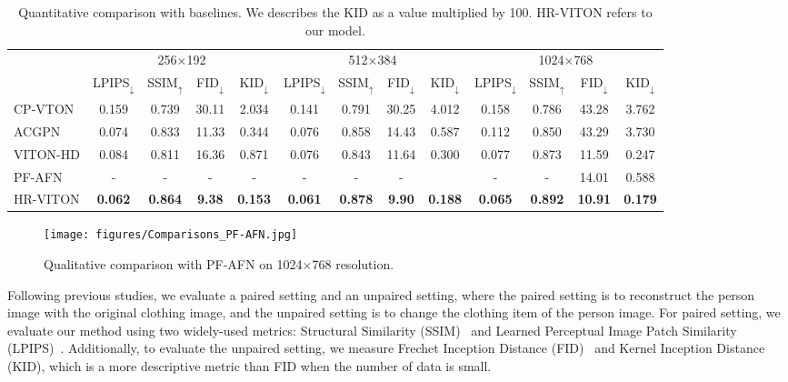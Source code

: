 \begin{table}[]
\centering
\scriptsize
\begin{tabular}{l|cccc|cccc|cccc}
    \toprule
     & \multicolumn{4}{c}{256$\times$192} & \multicolumn{4}{c}{512$\times$384} & \multicolumn{4}{c}{1024$\times$768}\\ 
& LPIPS$_{\downarrow}$ & SSIM$_{\uparrow}$ & FID$_{\downarrow}$ & KID$_{\downarrow}$ & LPIPS$_{\downarrow}$ & SSIM$_{\uparrow}$ & FID$_{\downarrow}$ & KID$_{\downarrow}$ & LPIPS$_{\downarrow}$ & SSIM$_{\uparrow}$ & FID$_{\downarrow}$ & KID$_{\downarrow}$ \\ 
    \midrule
    CP-VTON  & 0.159 & 0.739 & 30.11 & 2.034 
             & 0.141 & 0.791 & 30.25 & 4.012
             & 0.158 & 0.786 & 43.28 & 3.762
             \\
    ACGPN    & 0.074 & 0.833 & 11.33 & 0.344
             & 0.076 & 0.858 & 14.43 & 0.587
             & 0.112 & 0.850 & 43.29 & 3.730
             \\
    VITON-HD & 0.084 & 0.811 & 16.36 & 0.871
             & 0.076 & 0.843 & 11.64 & 0.300
             & 0.077 & 0.873 & 11.59 & 0.247
             \\
    PF-AFN & - & - & - & -
             & - & - & - &
             & - & - & 14.01 & 0.588
             \\
    \midrule
    HR-VITON    & \textbf{0.062} & \textbf{0.864} & \textbf{9.38} & \textbf{0.153}   
             & \textbf{0.061} & \textbf{0.878} & \textbf{9.90} & \textbf{0.188}
             & \textbf{0.065} & \textbf{0.892} & \textbf{10.91} & \textbf{0.179}
             \\ 
    \bottomrule
\end{tabular}
\caption{Quantitative comparison with baselines. 
         We describes the KID as a value multiplied by 100. HR-VITON refers to our model.}
\label{table:main}
\end{table}

\begin{figure}[b!]
    \texttt{[image: figures/Comparisons\_PF-AFN.jpg]}
    \caption{Qualitative comparison with PF-AFN on 1024×768 resolution.}
    \label{fig:PF}
\end{figure}
Following previous studies, we evaluate a paired setting and an unpaired setting, where the paired setting is to reconstruct the person image with the original clothing image, and the unpaired setting is to change the clothing item of the person image.
For paired setting, we evaluate our method using two widely-used metrics: Structural Similarity (SSIM)~\cite{wang2004image} and Learned Perceptual Image Patch Similarity (LPIPS)~\cite{zhang2018unreasonable}.
Additionally, to evaluate the unpaired setting, we measure Frechet Inception Distance (FID)~\cite{heusel2017gans} and Kernel Inception Distance (KID), which is a more descriptive metric than FID when the number of data is small.

